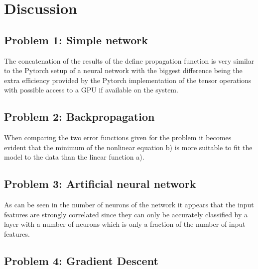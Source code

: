 \chapter{Discussion}
\section{Problem 1: Simple network}
The concatenation of the results of the define propagation function is very similar to the Pytorch setup of a neural network with the biggest difference being the extra efficiency provided by the Pytorch implementation of the tensor operations with possible access to a GPU if available on the system.
\section{Problem 2: Backpropagation}
When comparing the two error functions given for the problem it becomes evident that the minimum of the nonlinear equation b) is more suitable to fit the model to the data than the linear function a).
\section{Problem 3: Artificial neural network}
As can be seen in the number of neurons of the network it appears that the input features are strongly correlated since they can only be accurately classified by a layer with a number of neurons which is only a fraction of the number of input features.
\section{Problem 4: Gradient Descent}
